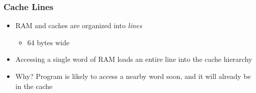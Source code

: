 \documentclass[xcolor=dvipsnames]{beamer}
\begin{document}
\begin{frame}
   \frametitle{Cache Lines}

   \begin{itemize}
      \item<+-> RAM and caches are organized into \emph{lines}
      \begin{itemize}
        \item<+-> 64 bytes wide
      \end{itemize}
      \item<+-> Accessing a single word of RAM loads an entire line
         into the cache hierarchy
      \item<+-> Why?  Program is likely to access a nearby word soon,
         and it will already be in the cache
   \end{itemize}

\end{frame}
\end{document}

